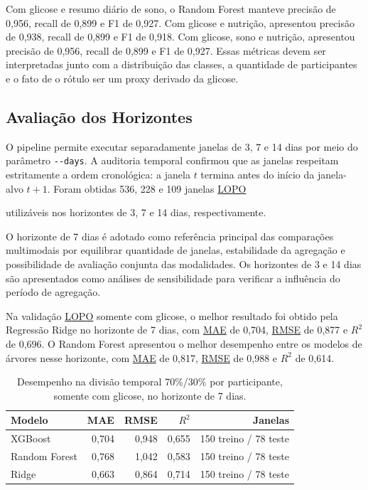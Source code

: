 \documentclass[12pt,a4paper]{article}
\DeclareRobustCommand{\sigla}[1]{%
    \texorpdfstring{\hyperlink{sigla:#1}{#1}}{#1}%
}
\begin{document}
Com glicose e resumo diário de sono, o Random Forest manteve precisão de 0,956,
recall de 0,899 e F1 de 0,927. Com glicose e nutrição, apresentou precisão de
0,938, recall de 0,899 e F1 de 0,918. Com glicose, sono e nutrição, apresentou
precisão de 0,956, recall de 0,899 e F1 de 0,927. Essas métricas devem ser
interpretadas junto com a distribuição das classes, a quantidade de
participantes e o fato de o rótulo ser um proxy derivado da glicose.

\subsection{Avaliação dos Horizontes}
O pipeline permite executar separadamente janelas de 3, 7 e 14 dias por meio
do parâmetro \texttt{-{}-days}. A auditoria temporal confirmou que as janelas
respeitam estritamente a ordem cronológica: a janela $t$ termina antes do
início da janela-alvo $t+1$. Foram obtidas 536, 228 e 109 janelas \sigla{LOPO}
utilizáveis nos horizontes de 3, 7 e 14 dias, respectivamente.

O horizonte de 7 dias é adotado como referência principal das comparações
multimodais por equilibrar quantidade de janelas, estabilidade da agregação e
possibilidade de avaliação conjunta das modalidades. Os horizontes de 3 e 14
dias são apresentados como análises de sensibilidade para verificar a influência
do período de agregação.

Na validação \sigla{LOPO} somente com glicose, o melhor resultado foi obtido
pela Regressão Ridge no horizonte de 7 dias, com \sigla{MAE} de 0,704,
\sigla{RMSE} de 0,877 e $R^2$ de 0,696. O Random Forest apresentou o melhor
desempenho entre os modelos de árvores nesse horizonte, com \sigla{MAE} de
0,817, \sigla{RMSE} de 0,988 e $R^2$ de 0,614.

\begin{table}[H]
    \centering
    \caption{Desempenho na divisão temporal 70\%/30\% por participante,
    somente com glicose, no horizonte de 7 dias.}
    \label{tab:temporal-7030-glucose}
    \small
    \begin{tabular}{lrrrr}
        \toprule
        Modelo & MAE & RMSE & $R^2$ & Janelas \\
        \midrule
        XGBoost & 0,704 & 0,948 & 0,655 & 150 treino / 78 teste \\
        Random Forest & 0,768 & 1,042 & 0,583 & 150 treino / 78 teste \\
        Ridge & 0,663 & 0,864 & 0,714 & 150 treino / 78 teste \\
        \bottomrule
    \end{tabular}
\end{table}
\end{document}

